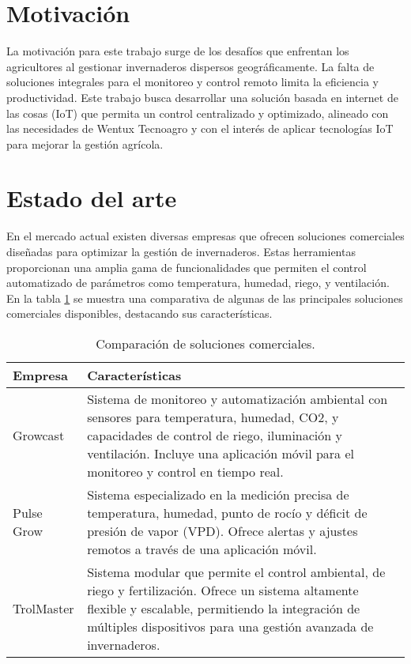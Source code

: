 
\section{Motivación}

La motivación para este trabajo surge de los desafíos que enfrentan los agricultores al gestionar invernaderos dispersos geográficamente. La falta de soluciones integrales para el monitoreo y control remoto limita la eficiencia y productividad. Este trabajo busca desarrollar una solución basada en internet de las cosas (IoT) que permita un control centralizado y optimizado, alineado con las necesidades de Wentux Tecnoagro y con el interés de aplicar tecnologías IoT para mejorar la gestión agrícola.


\section{Estado del arte}
En el mercado actual existen diversas empresas que ofrecen soluciones comerciales diseñadas para optimizar la gestión de invernaderos. Estas herramientas proporcionan una amplia gama de funcionalidades que permiten el control automatizado de parámetros como temperatura, humedad, riego, y ventilación. En la tabla \ref{tabla:empresas_invernaderos} se muestra una comparativa de algunas de las principales soluciones comerciales disponibles, destacando sus características.

\begin{table}[h]
	\centering
	\caption[Comparación de soluciones comerciales]{Comparación de soluciones comerciales.}
	\begin{tabular}{l p{10cm}}    
		\toprule
		\textbf{Empresa} 	 & \textbf{Características}  \\
		\midrule
		Growcast \citep{Growcast} & Sistema de monitoreo y automatización ambiental con sensores para temperatura, humedad, CO2, y capacidades de control de riego, iluminación y ventilación. Incluye una aplicación móvil para el monitoreo y control en tiempo real. \\		
		Pulse Grow \citep{pulsegrow}	 & Sistema especializado en la medición precisa de temperatura, humedad, punto de rocío y déficit de presión de vapor (VPD). Ofrece alertas y ajustes remotos a través de una aplicación móvil. \\
		TrolMaster \citep{trolmaster}	 & Sistema modular que permite el control ambiental, de riego y fertilización. Ofrece un sistema altamente flexible y escalable, permitiendo la integración de múltiples dispositivos para una gestión avanzada de invernaderos. \\
		\bottomrule
	\end{tabular}
	\label{tabla:empresas_invernaderos}
\end{table}


